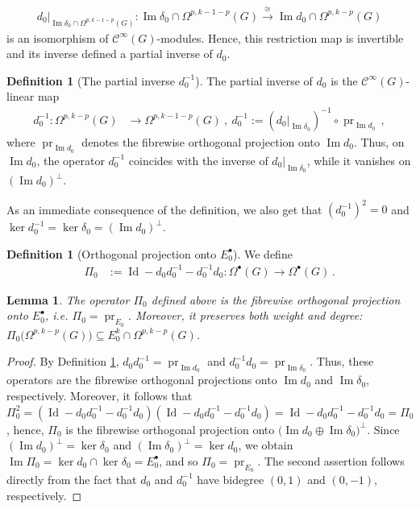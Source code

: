 \documentclass[dvipsnames]{amsart}
\newtheorem{lemma}[theorem]{Lemma}
\theoremstyle{definition}
\newtheorem{definition}[theorem]{Definition}
\theoremstyle{definition}
\numberwithin{equation}{section}
\newcommand{\C}{\mathcal{C}}
\begin{document}
\begin{align*}
d_0\big\vert_{\operatorname{Im}\delta_0\cap\Omega^{p,k-1-p}(G)}
\colon
\operatorname{Im}\delta_0\cap\Omega^{p,k-1-p}(G)
\xrightarrow{\ \cong\ }
\operatorname{Im}d_0\cap\Omega^{p,k-p}(G)
\end{align*}
is an isomorphism of $\mathcal{C}^\infty(G)$-modules. Hence, this restriction map is invertible and its inverse defined a partial inverse of $d_0$.
\begin{definition}[The partial inverse $d_0^{-1}$]\label{def: the partial inverse of d0}
    The partial inverse of $d_0$ is the $\C^\infty(G)$-linear map
\begin{align*}
d_0^{-1}\colon
\Omega^{p,k-p}(G)
&\longrightarrow
\Omega^{p,k-1-p}(G)\ ,\
d_0^{-1}
:=
\left(
d_0\big\vert_{\operatorname{Im}\delta_0}
\right)^{-1}
\circ\operatorname{pr}_{\operatorname{Im}d_0}\,,
\end{align*}
where $\operatorname{pr}_{\operatorname{Im}d_0}$ denotes the fibrewise orthogonal projection onto $\operatorname{Im}d_0$.
Thus, on $\operatorname{Im}d_0$, the operator $d_0^{-1}$ coincides with the inverse of $d_0\big|_{\operatorname{Im}\delta_0}$, while it vanishes on $(\operatorname{Im}d_0)^\perp$.
\end{definition}
As an immediate consequence of the definition, we also get that  $(d_0^{-1})^2=0$ and $\ker d_0^{-1}=\ker\delta_0=(\operatorname{Im}d_0)^\perp$.
\begin{definition}[Orthogonal projection onto $E_0^\bullet$]\label{def: Pi_0}
We define
\begin{align*}
\Pi_0
&:=
\operatorname{Id}
-d_0d_0^{-1}
-d_0^{-1}d_0
\colon
\Omega^\bullet(G)
\longrightarrow
\Omega^\bullet(G)\,.
\end{align*}

\end{definition}
\begin{lemma}
    The operator $\Pi_0$ defined above is the fibrewise orthogonal projection onto $E_0^\bullet$, i.e.  $\Pi_0 = \operatorname{pr}_{E_0}$. Moreover, it preserves both weight and degree:
$\Pi_0\bigl(\Omega^{p,k-p}(G)\bigr)
\subseteq
E_0^k\cap\Omega^{p,k-p}(G)$.
\end{lemma}
\begin{proof}
    By Definition \ref{def: the partial inverse of d0}, 
$
d_0d_0^{-1}
=
\operatorname{pr}_{\operatorname{Im}d_0}$ and $
d_0^{-1}d_0
=
\operatorname{pr}_{\operatorname{Im}\delta_0}
$.
Thus, these operators are the fibrewise orthogonal projections onto $\operatorname{Im}d_0$ and $\operatorname{Im}\delta_0$, respectively. Moreover, it follows that $\Pi_0^2=(\operatorname{Id}-d_0d_0^{-1}-d_0^{-1}d_0)(\operatorname{Id}-d_0d_0^{-1}-d_0^{-1}d_0)=\operatorname{Id}-d_0d_0^{-1}-d_0^{-1}d_0=\Pi_0$, hence, $\Pi_0$ is the fibrewise orthogonal projection onto
$
\big(\operatorname{Im}d_0\oplus\operatorname{Im}\delta_0\big)^\perp$. Since $(\operatorname{Im}d_0)^\perp=\ker\delta_0$ and $(\operatorname{Im}\delta_0)^\perp=\ker d_0$,
we obtain $\operatorname{Im}\Pi_0
=
\ker d_0\cap\ker\delta_0
=
E_0^\bullet
$, and so $\Pi_0=\operatorname{pr}_{E_0}$. The second assertion follows directly from the fact that $d_0$ and $d_0^{-1}$ have bidegree $(0,1)$ and $(0,-1)$, respectively.
\end{proof}
\end{document}
